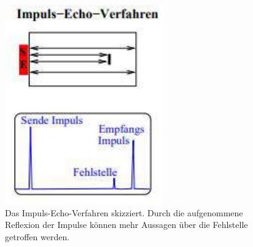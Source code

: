 \begin{figure}
    \centering
    \includegraphics[width=\textwidth]{content/impuls_echo.pdf}
    \caption{Das Impuls-Echo-Verfahren skizziert. Durch die aufgenommene Reflexion der Impulse können mehr Aussagen über die Fehlstelle getroffen werden. \cite{anleitung}}
    \label{fig:impuls-echo}
\end{figure}